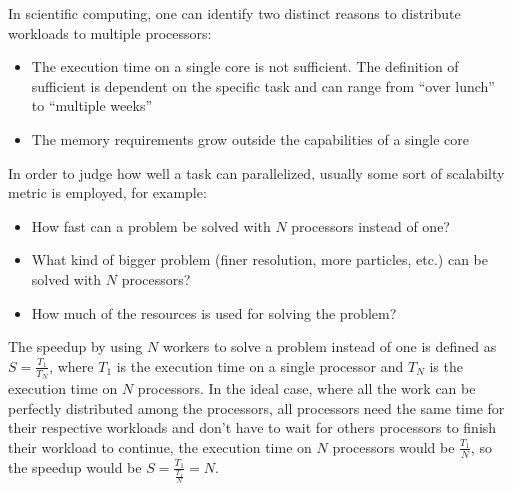 \documentclass[main.tex]{subfiles}
\begin{document}
In scientific computing, one can identify two distinct reasons to distribute workloads to multiple processors:
\begin{itemize}
    \item The execution time on a single core is not sufficient. The definition of sufficient is dependent on the specific task and can range from \enquote{over lunch} to \enquote{multiple weeks}
    \item The memory requirements grow outside the capabilities of a single core
\end{itemize}
In order to judge how well a task can parallelized, usually some sort of scalabilty metric is employed, for example:
\begin{itemize}
    \item How fast can a problem be solved with \(N\) processors instead of one?
    \item What kind of bigger problem (finer resolution, more particles, etc.) can be solved with \(N\) processors?
    \item How much of the resources is used for solving the problem?
\end{itemize}
The speedup by using \(N\) workers to solve a problem instead of one is defined as \(S = \frac{T_1}{T_N}\), where \(T_1\) is the execution time on a single processor and \(T_N\) is the execution time on \(N\) processors.
In the ideal case, where all the work can be perfectly distributed among the processors, all processors need the same time for their respective workloads and don't have to wait for others processors to finish their workload to continue, the execution time on \(N\) processors would be \(\frac{T_1}{N}\), so the speedup would be \(S = \frac{T_1}{\frac{T_1}{N}} = N\).
\end{document}
